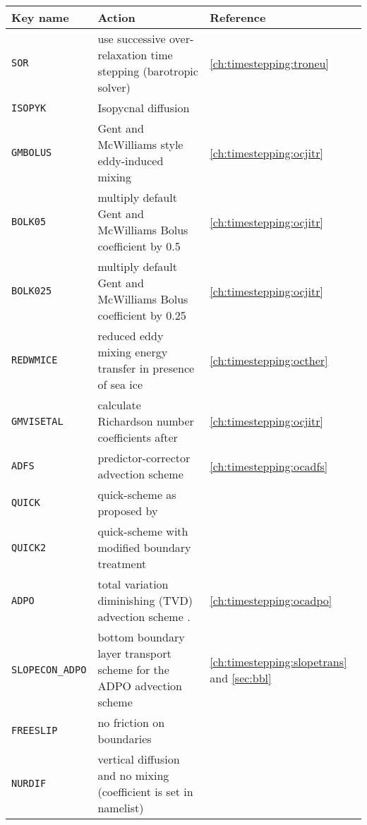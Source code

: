 \begin{table}[ht]
\begin{footnotesize}
        \begin{tabular}[t]{l|p{9cm}|p{1cm}}
          Key name &
          Action &
	  Reference \\
        \hline
         \texttt{SOR} &
           use successive over-relaxation time stepping (barotropic solver)  &	      
           \ref{ch:timestepping:troneu}\\
         \texttt{ISOPYK} &
           Isopycnal diffusion  &
        \\\hline
         \texttt{GMBOLUS} &
          Gent and McWilliams style eddy-induced mixing \citep{Gent:1995}   &
        \ref{ch:timestepping:ocjitr}\\
         \texttt{BOLK05} &
           multiply default Gent and McWilliams Bolus coefficient by 0.5 &
        \ref{ch:timestepping:ocjitr}\\
         \texttt{BOLK025} &
           multiply default Gent and McWilliams Bolus coefficient by 0.25  &	      
        \ref{ch:timestepping:ocjitr}\\
         \texttt{REDWMICE} &
           reduced eddy mixing energy transfer in presence of sea ice  &	      
        \ref{ch:timestepping:octher}\\
         \texttt{GMVISETAL} &
           calculate Richardson number coefficients after \cite{Visbeck:1997}  &
        \ref{ch:timestepping:ocjitr}\\\hline
         \texttt{ADFS} &
           predictor-corrector advection scheme &
        \ref{ch:timestepping:ocadfs}\\
         \texttt{QUICK} &
           quick-scheme as proposed by \cite{Farrow:1995} &
        \\
         \texttt{QUICK2} &
            quick-scheme with modified boundary treatment &
        \\	   	
         \texttt{ADPO} &
           total variation diminishing (TVD) advection scheme \citep{Sweby:1984}. &
        \ref{ch:timestepping:ocadpo}\\
         \texttt{SLOPECON\_ADPO} &
           bottom boundary layer transport scheme for the ADPO advection scheme  &
        \ref{ch:timestepping:slopetrans} and \ref{sec:bbl}\\
         \texttt{FREESLIP} &
           no friction on boundaries  &   
        \\\hline
         \texttt{NURDIF} &
           vertical diffusion and no mixing (coefficient is set in namelist) &

\end{tabular}
\end{footnotesize}
\end{table}
